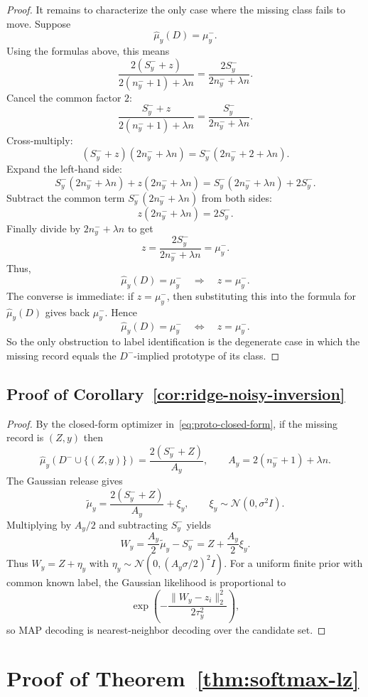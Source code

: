 \documentclass[11pt,a4paper]{report}
\theoremstyle{plain}
\theoremstyle{definition}
\theoremstyle{remark}
\begin{document}
\begin{proof}
It remains to characterize the only case where the missing class fails to move. Suppose
\[
\widehat\mu_y(D)=\mu_y^-.
\]
Using the formulas above, this means
\[
\frac{2(S_y^-+z)}{2(n_y^-+1)+\lambda n}
=
\frac{2S_y^-}{2n_y^-+\lambda n}.
\]
Cancel the common factor $2$:
\[
\frac{S_y^-+z}{2(n_y^-+1)+\lambda n}
=
\frac{S_y^-}{2n_y^-+\lambda n}.
\]
Cross-multiply:
\[
(S_y^-+z)(2n_y^-+\lambda n)
=
S_y^-(2n_y^-+2+\lambda n).
\]
Expand the left-hand side:
\[
S_y^-(2n_y^-+\lambda n)+z(2n_y^-+\lambda n)
=
S_y^-(2n_y^-+\lambda n)+2S_y^-.
\]
Subtract the common term $S_y^-(2n_y^-+\lambda n)$ from both sides:
\[
z(2n_y^-+\lambda n)=2S_y^-.
\]
Finally divide by $2n_y^-+\lambda n$ to get
\[
z=\frac{2S_y^-}{2n_y^-+\lambda n}=\mu_y^-.
\]
Thus,
\[
\widehat\mu_y(D)=\mu_y^- \quad \Longrightarrow \quad z=\mu_y^-.
\]
The converse is immediate: if $z=\mu_y^-$, then substituting this into the formula for $\widehat\mu_y(D)$ gives back $\mu_y^-$. Hence
\[
\widehat\mu_y(D)=\mu_y^- \quad \Longleftrightarrow \quad z=\mu_y^-.
\]
So the only obstruction to label identification is the degenerate case in which the missing record equals the $D^-$-implied prototype of its class.
\end{proof}

\subsection{Proof of Corollary~\ref{cor:ridge-noisy-inversion}}

\begin{proof}
By the closed-form optimizer in~\eqref{eq:proto-closed-form}, if the missing record is $(Z,y)$ then
\[
\widehat\mu_y(D^-\cup\{(Z,y)\})=\frac{2(S_y^-+Z)}{A_y},
\qquad
A_y=2(n_y^-+1)+\lambda n.
\]
The Gaussian release gives
\[
\widetilde\mu_y=\frac{2(S_y^-+Z)}{A_y}+\xi_y,
\qquad
\xi_y\sim\mathcal N(0,\sigma^2 I).
\]
Multiplying by $A_y/2$ and subtracting $S_y^-$ yields
\[
W_y=\frac{A_y}{2}\widetilde\mu_y-S_y^-
=Z+\frac{A_y}{2}\xi_y.
\]
Thus $W_y=Z+\eta_y$ with $\eta_y\sim\mathcal N(0,(A_y\sigma/2)^2I)$.
For a uniform finite prior with common known label, the Gaussian likelihood is proportional to
\[
\exp\!\left(-\frac{\|W_y-z_i\|_2^2}{2\tau_y^2}\right),
\]
so MAP decoding is nearest-neighbor decoding over the candidate set.
\end{proof}


\section{Proof of Theorem~\ref{thm:softmax-lz}}
\label{app:proof-softmax}
\end{document}

